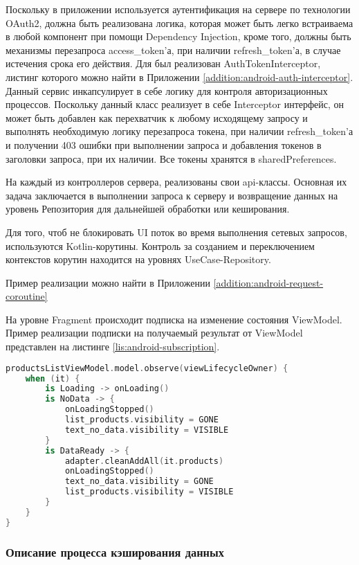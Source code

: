 Поскольку в приложении используется аутентификация на сервере по технологии OAuth2, должна быть реализована логика, которая может быть легко встраиваема в любой компонент при помощи Dependency Injection, кроме того, должны быть механизмы перезапроса access\_token’а, при наличии refresh\_token’а, в случае истечения срока его действия.
Для был реализован AuthTokenInterceptor, листинг которого можно найти в Приложении \ref{addition:android-auth-interceptor}.
Данный сервис инкапсулирует в себе логику для контроля авторизационных процессов.
Поскольку данный класс реализует в себе Interceptor интерфейс, он может быть добавлен как перехватчик к любому исходящему запросу и выполнять необходимую логику перезапроса токена, при наличии refresh\_token’а и получении 403 ошибки при выполнении запроса и добавления токенов в заголовки запроса, при их наличии.
Все токены хранятся в sharedPreferences.

На каждый из контроллеров сервера, реализованы свои api-классы.
Основная их задача заключается в выполнении запроса к серверу и возвращение данных на уровень Репозитория для дальнейшей обработки или кеширования.

Для того, чтоб не блокировать UI поток во время выполнения сетевых запросов, используются Kotlin-корутины.
Контроль за созданием и переключением контекстов корутин находится на уровнях UseCase-Repository.

Пример реализации можно найти в Приложении \ref{addition:android-request-coroutine}

На уровне Fragment происходит подписка на изменение состояния ViewModel.
Пример реализации подписки на получаемый результат от ViewModel представлен на листинге \ref{lis:android-subscription}.

\begin{lstlisting}[language=Kotlin, captionpos=b,
label={lis:android-subscription},
caption={Пример реализации подписки на ViewModel}
]
productsListViewModel.model.observe(viewLifecycleOwner) {
    when (it) {
        is Loading -> onLoading()
        is NoData -> {
            onLoadingStopped()
            list_products.visibility = GONE
            text_no_data.visibility = VISIBLE
        }
        is DataReady -> {
            adapter.cleanAddAll(it.products)
            onLoadingStopped()
            text_no_data.visibility = GONE
            list_products.visibility = VISIBLE
        }
    }
}
\end{lstlisting}

\subsubsection{Описание процесса кэширования данных}\indent

